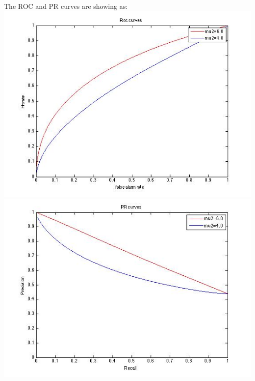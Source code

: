 \documentclass[12pt]{ctexart}
\begin{document}
The ROC and PR curves are showing as: \\
\includegraphics[scale=0.8]{hw1_Roc_curve.jpg} \\
\includegraphics[scale=0.8]{hw1_PR_curve.jpg} \\
\end{document}

